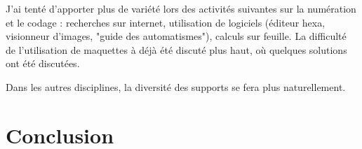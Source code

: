 \documentclass[pdftex,a4paper,12pt]{article}
\begin{document}
	J'ai tenté d'apporter plus de variété lors des activités suivantes sur la numération et le codage : 
	recherches sur internet, utilisation de logiciels (éditeur hexa, visionneur d'images, "guide des automatismes"), calculs sur feuille.
	La difficulté de l'utilisation de maquettes à déjà été discuté plus haut, où quelques solutions ont été discutées.

	Dans les autres disciplines, la diversité des supports se fera plus naturellement.

	\section{Conclusion}
\end{document}
